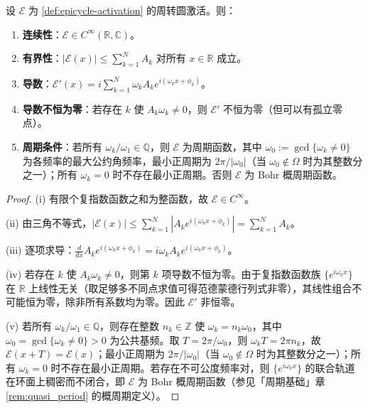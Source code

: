 \begin{proposition}[基本分析性质]\label{prop:epicycle-basic-properties}
设 $\mathcal E$ 为 \cref{def:epicycle-activation} 的周转圆激活。则：
\begin{enumerate}[label=(\roman*)]
    \item \textbf{连续性}：$\mathcal E\in C^\infty(\mathbb R,\mathbb C)$。
    \item \textbf{有界性}：$|\mathcal E(x)|\le \sum_{k=1}^{N}A_k$ 对所有 $x\in\mathbb R$ 成立。
    \item \textbf{导数}：$\mathcal E'(x)=i\sum_{k=1}^{N}\omega_k A_k e^{i(\omega_k x+\phi_k)}$。
    \item \textbf{导数不恒为零}：若存在 $k$ 使 $A_k\omega_k\neq 0$，则 $\mathcal E'$ 不恒为零（但可以有孤立零点）。
    \item \textbf{周期条件}：若所有 $\omega_k/\omega_1\in\mathbb Q$，则 $\mathcal E$ 为周期函数，其中 $\omega_0:=\gcd\{\omega_k\ne0\}$ 为各频率的最大公约角频率，最小正周期为 $2\pi/\lvert\omega_0\rvert$（当 $\omega_0\notin\Omega$ 时为其整数分之一）；所有 $\omega_k=0$ 时不存在最小正周期。否则 $\mathcal E$ 为 Bohr 概周期函数。
\end{enumerate}
\end{proposition}

\begin{proof}
(i) 有限个复指数函数之和为整函数，故 $\mathcal E\in C^\infty$。

(ii) 由三角不等式，$|\mathcal E(x)|\le\sum_{k=1}^{N}|A_k e^{i(\omega_k x+\phi_k)}|=\sum_{k=1}^{N}A_k$。

(iii) 逐项求导：$\frac{d}{dx}A_k e^{i(\omega_k x+\phi_k)}=i\omega_k A_k e^{i(\omega_k x+\phi_k)}$。

(iv) 若存在 $k$ 使 $A_k\omega_k\neq 0$，则第 $k$ 项导数不恒为零。由于复指数函数族 $\{e^{i\omega_k x}\}$ 在 $\mathbb R$ 上线性无关（取足够多不同点求值可得范德蒙德行列式非零），其线性组合不可能恒为零，除非所有系数均为零。因此 $\mathcal E'$ 非恒零。

(v) 若所有 $\omega_k/\omega_1\in\mathbb Q$，则存在整数 $n_k\in\mathbb Z$ 使 $\omega_k=n_k\omega_0$，其中 $\omega_0=\gcd\{\omega_k\ne0\}>0$ 为公共基频。取 $T=2\pi/\omega_0$，则 $\omega_k T=2\pi n_k$，故 $\mathcal E(x+T)=\mathcal E(x)$；最小正周期为 $2\pi/\lvert\omega_0\rvert$（当 $\omega_0\notin\Omega$ 时为其整数分之一）；所有 $\omega_k=0$ 时不存在最小正周期。若存在不可公度频率对，则 $\{e^{i\omega_k x}\}$ 的联合轨道在环面上稠密而不闭合，即 $\mathcal E$ 为 Bohr 概周期函数（参见「周期基础」章 \cref{rem:quasi_period} 的概周期定义）。
\end{proof}


